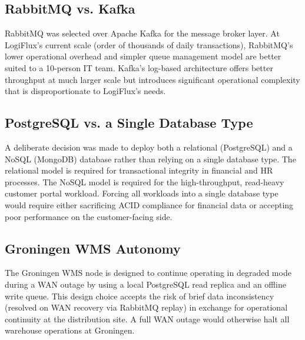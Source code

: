 \subsection{RabbitMQ vs. Kafka}

RabbitMQ was selected over Apache Kafka for the message broker layer. At LogiFlux's current scale (order of thousands of daily transactions), RabbitMQ's lower operational overhead and simpler queue management model are better suited to a 10-person IT team. Kafka's log-based architecture offers better throughput at much larger scale but introduces significant operational complexity that is disproportionate to LogiFlux's needs.

\subsection{PostgreSQL vs. a Single Database Type}

A deliberate decision was made to deploy both a relational (PostgreSQL) and a NoSQL (MongoDB) database rather than relying on a single database type. The relational model is required for transactional integrity in financial and HR processes. The NoSQL model is required for the high-throughput, read-heavy customer portal workload. Forcing all workloads into a single database type would require either sacrificing ACID compliance for financial data or accepting poor performance on the customer-facing side.

\subsection{Groningen WMS Autonomy}

The Groningen WMS node is designed to continue operating in degraded mode during a WAN outage by using a local PostgreSQL read replica and an offline write queue. This design choice accepts the risk of brief data inconsistency (resolved on WAN recovery via RabbitMQ replay) in exchange for operational continuity at the distribution site. A full WAN outage would otherwise halt all warehouse operations at Groningen.
